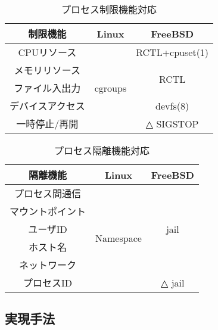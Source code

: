 \documentclass[11pt]{jarticle}
\begin{document}
\begin{table}
\vspace{-1.7em}
  \caption{プロセス制限機能対応}
  \vspace{-1em}
  \label{tb:limit}
  \begin{center}
  \begin{tabular}{|c|c|c|} \hline
    制限機能 & Linux & FreeBSD \\ \hline \hline
    CPUリソース & \multirow{5}{*}{cgroups} &  RCTL+cpuset(1) \\ \cline{1-1} \cline{3-3}
    メモリリソース &  &  \multirow{2}{*}{RCTL} \\ \cline{1-1}
    ファイル入出力 &  &  \\ \cline{1-1} \cline{3-3}
    デバイスアクセス &  & devfs(8) \\ \cline{1-1} \cline{3-3}
    一時停止/再開 &  & △ SIGSTOP \\ \hline
  \end{tabular}
\end{center}
\end{table}
\begin{table}
  \vspace{-1em}
  \caption{プロセス隔離機能対応}
  \label{tb:isolation}
  \begin{center}
  \begin{tabular}{|c|c|c|} \hline
    隔離機能 & Linux & FreeBSD \\ \hline \hline
    プロセス間通信 & \multirow{6}{*}{Namespace} &  \multirow{5}{*}{jail} \\ \cline{1-1}
    マウントポイント &  & \\ \cline{1-1}
    ユーザID &  &  \\ \cline{1-1}
    ホスト名 &  & \\ \cline{1-1}
    ネットワーク &  & \\ \cline{1-1} \cline{3-3}
    プロセスID &  & △ jail \\ \hline
  \end{tabular}
\end{center}
\end{table}

\subsection{実現手法}
\end{document}

